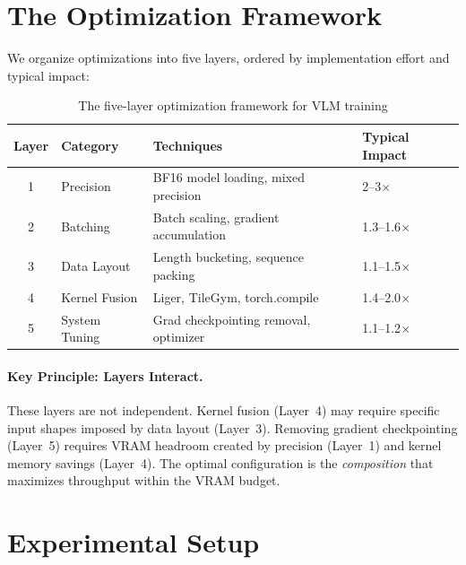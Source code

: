 \documentclass[11pt,a4paper]{article}
\begin{document}
\section{The Optimization Framework}
\label{sec:framework}

We organize optimizations into five layers, ordered by implementation effort and
typical impact:

\begin{table}[H]
\centering
\caption{The five-layer optimization framework for VLM training}
\label{tab:framework}
\begin{tabular}{@{}clll@{}}
\toprule
\textbf{Layer} & \textbf{Category} & \textbf{Techniques} & \textbf{Typical Impact} \\
\midrule
1 & Precision & BF16 model loading, mixed precision & 2--3$\times$ \\
2 & Batching & Batch scaling, gradient accumulation & 1.3--1.6$\times$ \\
3 & Data Layout & Length bucketing, sequence packing & 1.1--1.5$\times$ \\
4 & Kernel Fusion & Liger, TileGym, torch.compile & 1.4--2.0$\times$ \\
5 & System Tuning & Grad checkpointing removal, optimizer & 1.1--1.2$\times$ \\
\bottomrule
\end{tabular}
\end{table}

\paragraph{Key Principle: Layers Interact.}
These layers are not independent. Kernel fusion (Layer~4) may require specific input shapes
imposed by data layout (Layer~3). Removing gradient checkpointing (Layer~5) requires VRAM
headroom created by precision (Layer~1) and kernel memory savings (Layer~4). The optimal
configuration is the \emph{composition} that maximizes throughput within the VRAM budget.

\section{Experimental Setup}
\label{sec:setup}
\end{document}
